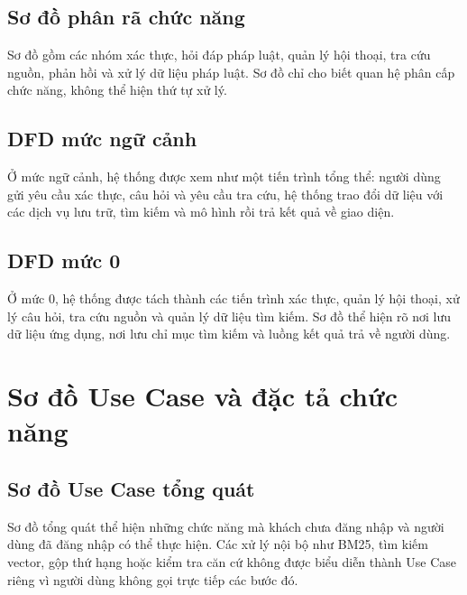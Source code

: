 \documentclass[12pt,a4paper,oneside]{report}
\begin{document}
\subsection{Sơ đồ phân rã chức năng}
Sơ đồ gồm các nhóm xác thực, hỏi đáp pháp luật, quản lý hội thoại, tra cứu nguồn, phản hồi và xử lý dữ liệu pháp luật. Sơ đồ chỉ cho biết quan hệ phân cấp chức năng, không thể hiện thứ tự xử lý.

\subsection{DFD mức ngữ cảnh}
Ở mức ngữ cảnh, hệ thống được xem như một tiến trình tổng thể: người dùng gửi yêu cầu xác thực, câu hỏi và yêu cầu tra cứu, hệ thống trao đổi dữ liệu với các dịch vụ lưu trữ, tìm kiếm và mô hình rồi trả kết quả về giao diện.

\subsection{DFD mức 0}
Ở mức 0, hệ thống được tách thành các tiến trình xác thực, quản lý hội thoại, xử lý câu hỏi, tra cứu nguồn và quản lý dữ liệu tìm kiếm. Sơ đồ thể hiện rõ nơi lưu dữ liệu ứng dụng, nơi lưu chỉ mục tìm kiếm và luồng kết quả trả về người dùng.

\section{Sơ đồ Use Case và đặc tả chức năng}
\subsection{Sơ đồ Use Case tổng quát}
Sơ đồ tổng quát thể hiện những chức năng mà khách chưa đăng nhập và người dùng đã đăng nhập có thể thực hiện. Các xử lý nội bộ như BM25, tìm kiếm vector, gộp thứ hạng hoặc kiểm tra căn cứ không được biểu diễn thành Use Case riêng vì người dùng không gọi trực tiếp các bước đó.
\end{document}

